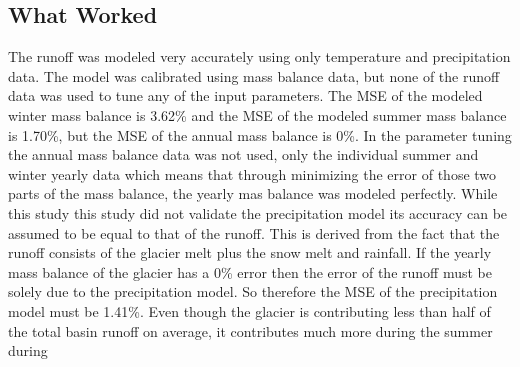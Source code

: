 \documentclass{article}
\begin{document}
\subsection{What Worked}
The runoff was modeled very accurately using only temperature and precipitation data. The model was calibrated using mass balance data, but 
none of the runoff data was used to tune any of the input parameters. The MSE of the modeled winter mass balance is 3.62\% and the MSE of the 
modeled summer mass balance is 1.70\%, but the MSE of the annual mass balance is 0\%. In the parameter tuning the annual mass balance data 
was not used, only the individual summer and winter yearly data which means that through minimizing the error of those two parts of the 
mass balance, the yearly mas balance was modeled perfectly. 
While this study this study did not validate the precipitation model its accuracy can be assumed to be equal to that of the runoff. This is 
derived from the fact that the runoff consists of the glacier melt plus the snow melt and rainfall. If the yearly mass balance of the glacier 
has a 0\% error then the error of the runoff must be solely due to the precipitation model. So therefore the MSE of the precipitation 
model must be 1.41\%.
Even though the glacier is contributing less than half of the total basin runoff on average, it contributes much more during the summer during 
\end{document}
